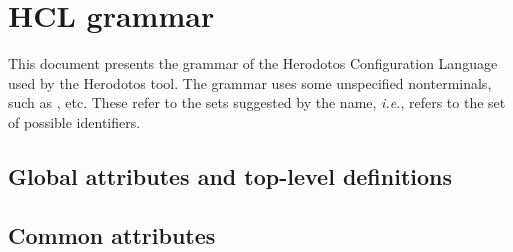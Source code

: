 
\chapter{HCL grammar}
\label{sec:hcl-grammar}

This document presents the grammar of the Herodotos Configuration
Language used by the Herodotos tool. The grammar uses some unspecified
nonterminals, such as , etc.  These refer to the sets suggested
by the name, {\em i.e.},  refers to the set of possible
identifiers.

% 
\section{Global attributes and top-level definitions}
\label{sec:globattr}

  \begin{grammar}





  \end{grammar}

\section{Common attributes}
\label{sec:commonattr}

  \begin{grammar}
  \end{grammar}

